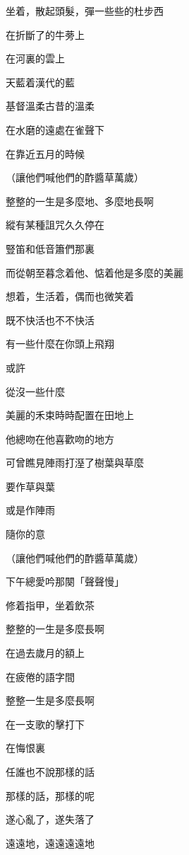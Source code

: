 坐着，散起頭髮，彈一些些的杜步西

在折斷了的牛蒡上

在河裏的雲上

天藍着漢代的藍

基督溫柔古昔的溫柔

在水磨的遠處在雀聲下

在靠近五月的時候

（讓他們喊他們的酢醬草萬歲）


整整的一生是多麼地、多麼地長啊

縱有某種詛咒久久停在

豎笛和低音簫們那裏

而從朝至暮念着他、惦着他是多麼的美麗



想着，生活着，偶而也微笑着

既不快活也不不快活

有一些什麼在你頭上飛翔

或許

從沒一些什麼



美麗的禾束時時配置在田地上

他總吻在他喜歡吻的地方

可曾瞧見陣雨打溼了樹葉與草麼

要作草與葉

或是作陣雨

隨你的意

（讓他們喊他們的酢醬草萬歲）


下午總愛吟那闋「聲聲慢」

修着指甲，坐着飲茶

整整的一生是多麼長啊

在過去歲月的額上

在疲倦的語字間



整整一生是多麼長啊

在一支歌的擊打下

在悔恨裏



任誰也不說那樣的話

那樣的話，那樣的呢

遂心亂了，遂失落了

遠遠地，遠遠遠遠地
